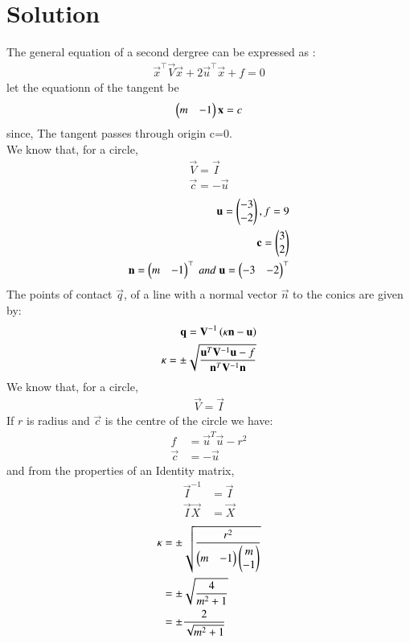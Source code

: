 \documentclass[journal,12pt,twocolumn]{IEEEtran}
\begin{document}
\section{Solution}
The general equation of a second dergree can be expressed as :
\begin{align}
    \vec{x}^\top\vec{V}\vec{x}+2\vec{u}^\top\vec{x} + f = 0 
\end{align}
let the equationn of the tangent be
\begin{align}
    \begin{pmatrix}m & -1\end{pmatrix}\mathbf{x} = c 
\end{align}
since, The tangent passes through origin c=0.\\
We know that, for a circle,
\begin{align}
    \vec{V} = \vec{I}\\
    \vec{c} = -\vec{u}
\end{align}
\begin{align}
   \mathbf{u} = \begin{pmatrix}-3 \\ -2\end{pmatrix}, f=9\\
   \mathbf{c}=\begin{pmatrix}3 \\ 2\end{pmatrix}\\
    \mathbf{n} = \begin{pmatrix}m & -1\end{pmatrix}^\top \; and \; \mathbf{u}=\begin{pmatrix}-3 &-2\end{pmatrix}^\top 
\end{align}
The points of contact $\vec{q}$, of a line with a normal vector $\vec{n}$ to the conics are given by:
\begin{align}
\mathbf{q} = \mathbf{V}^{-1}\left(\kappa \mathbf{n}-\mathbf{u}\right) \label{eq:9} \\
\kappa = \pm \sqrt{\frac{\mathbf{u}^T\mathbf{V}^{-1}\mathbf{u}-f}{\mathbf{n}^T\mathbf{V}^{-1}\mathbf{n}}}\label{eq:10}
\end{align}
We know that, for a circle, 
\begin{align}
\vec{V} = \vec{I}\label{eq:11}  
\end{align}
If $r$ is radius and $\vec{c}$ is the centre of the circle we have:
\begin{align}
f &=\vec{u}^T\vec{u}-r^2  \label{eq:5} \\  
\vec{c} &=-\vec{u}
\end{align}
and from the properties of an Identity matrix, 
\begin{align}
\vec{I}^{-1} &= \vec{I} \\
\vec{I}\vec{X} &= \vec{X}   
\end{align}
\begin{align}
\kappa &= \pm \sqrt{\frac{r^2}{\begin{pmatrix}m & -1 \end{pmatrix}\begin{pmatrix}m \\ -1 \end{pmatrix}}} \\
&= \pm \sqrt{\frac{4}{m^2+1}} \\
& =  \pm \frac{2}{\sqrt{m^2+1}}
\end{align}
\end{document}
